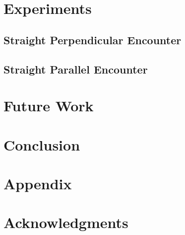 \documentclass[conf]{new-aiaa}
\begin{document}
\fi




\section{Experiments}

\subsection{Straight Perpendicular Encounter}

\subsection{Straight Parallel Encounter}



\section{Future Work}




\section{Conclusion}




\section*{Appendix}


\section*{Acknowledgments}



\end{document}

